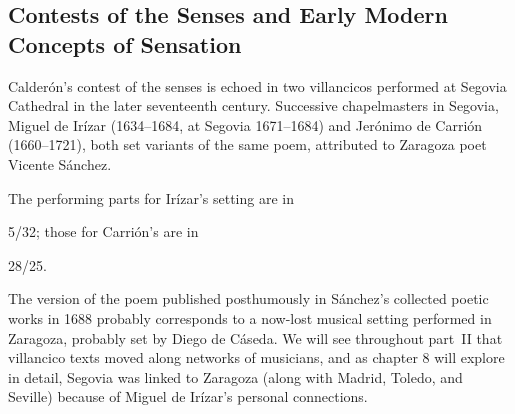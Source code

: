 \subsection{Contests of the Senses and Early Modern Concepts of Sensation}

Calderón's contest of the senses is echoed in two villancicos performed at Segovia Cathedral in the later seventeenth century.
Successive chapelmasters in Segovia, Miguel de Irízar (1634--1684, at Segovia 1671--1684) and Jerónimo de Carrión (1660--1721), both set variants of the same poem, attributed to Zaragoza poet Vicente Sánchez.%
  \begin{Footnote}
  The performing parts for Irízar's setting are in \signature{E-SE}{5/32}; those for Carrión's are in \signature{E-SE}{28/25}.
  \end{Footnote}
The version of the poem published posthumously in Sánchez's collected poetic works in 1688 probably corresponds to a now-lost musical setting performed in Zaragoza, probably set by Diego de Cáseda.%
  \autocite[171--172]{Sanchez:LiraPoetica}
We will see throughout part~II that villancico texts moved along networks of musicians, and as chapter 8 will explore in detail, Segovia was linked to Zaragoza (along with Madrid, Toledo, and Seville) because of Miguel de Irízar's personal connections.




